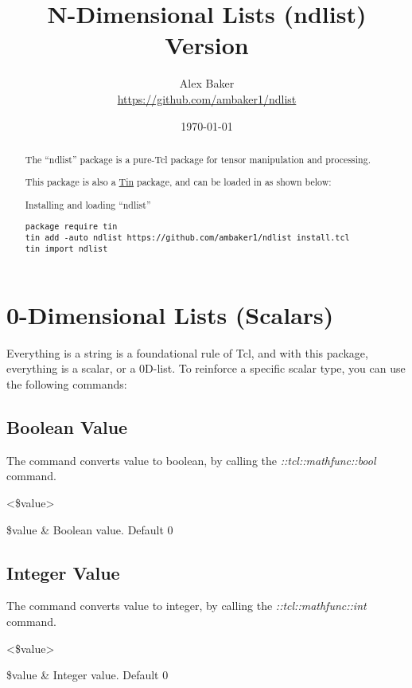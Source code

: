 \documentclass{article}
\title{\Huge{N-Dimensional Lists (ndlist)}\\\large Version \version}
\author{Alex Baker\\\small\url{https://github.com/ambaker1/ndlist}}
\date{\small\today}
\begin{document}
\maketitle
\begin{abstract}
\begin{center}
The ``ndlist'' package is a pure-Tcl package for tensor manipulation and processing.

This package is also a \textcolor{blue}{\href{https://github.com/ambaker1/Tin}{Tin}} package, and can be loaded in as shown below:
\end{center}
\begin{example}{Installing and loading ``ndlist''}
\begin{lstlisting}
package require tin
tin add -auto ndlist https://github.com/ambaker1/ndlist install.tcl
tin import ndlist
\end{lstlisting}
\end{example}
\end{abstract}
\clearpage
\section{0-Dimensional Lists (Scalars)}
Everything is a string is a foundational rule of Tcl, and with this package, everything is a scalar, or a 0D-list. 
To reinforce a specific scalar type, you can use the following commands:
\subsection{Boolean Value}
The command  converts value to boolean, by calling the \textit{::tcl::mathfunc::bool} command.
\begin{syntax}
 <\$value>
\end{syntax}
\begin{args}
\$value & Boolean value. Default 0
\end{args}
\subsection{Integer Value}
The command  converts value to integer, by calling the \textit{::tcl::mathfunc::int} command.
\begin{syntax}
 <\$value>
\end{syntax}
\begin{args}
\$value & Integer value. Default 0
\end{args}
\end{document}
